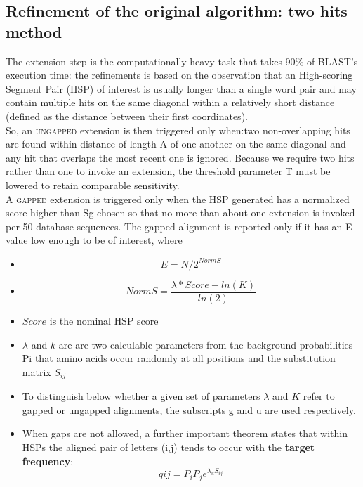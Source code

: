        \subsection{Refinement of the original algorithm: two hits method} \label{refinement}
        The extension step is the computationally heavy task that takes 90\% of BLAST's execution time: the refinements is based on the observation that an High-scoring Segment Pair (HSP) of interest is usually longer than a single word pair and may contain multiple hits on the same diagonal within a relatively short distance (defined as the distance between their first coordinates). \\
        So, an \textsc{ungapped} extension is then triggered only when:two non-overlapping hits are
        found within distance of length A of one another on the same diagonal and any hit that overlaps the most recent one is ignored. Because we require two hits rather than one to invoke an extension, the threshold parameter T must be lowered to retain comparable sensitivity. \\
        A \textsc{gapped} extension is triggered only when the HSP generated has a normalized score higher than S{g} chosen so that no more
        than about one extension is invoked per 50 database sequences. The gapped alignment is reported only if it has an E-value low enough to be of interest, where 
        \begin{itemize}
            \item $$  E = N/2^{NormS} $$
            \item $$ NormS = \frac{\lambda * Score - ln(K)}{ln(2)} $$
            \item $Score$ is the nominal HSP score
            \item $ \lambda $ and $k$ are are two calculable parameters from the background probabilities P{i} that amino acids occur randomly at all positions and the substitution matrix $S_{ij}$
            \item To distinguish below whether a given set of parameters $\lambda$ and $K$ refer to gapped or ungapped alignments, the subscripts g and u are used respectively.
            \item  When gaps are not allowed, a further important theorem states that within HSPs the aligned pair of letters (i,j) tends to occur with the \textbf{target frequency}: 
            $$ q{ij} = P_iP_je^{\lambda_uS_{ij}} $$
        \end{itemize}
        
